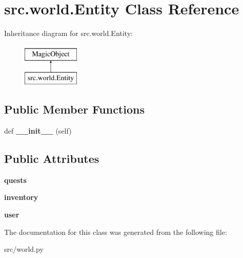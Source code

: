 \hypertarget{classsrc_1_1world_1_1_entity}{}\section{src.\+world.\+Entity Class Reference}
\label{classsrc_1_1world_1_1_entity}
Inheritance diagram for src.\+world.\+Entity\+:\begin{figure}[H]
\begin{center}
\leavevmode
\includegraphics[height=2.000000cm]{classsrc_1_1world_1_1_entity}
\end{center}
\end{figure}
\subsection*{Public Member Functions}
\begin{DoxyCompactItemize}
\item 
\hypertarget{classsrc_1_1world_1_1_entity_a1a31674f6b3c2e9ec166dde522201412}{}\label{classsrc_1_1world_1_1_entity_a1a31674f6b3c2e9ec166dde522201412} 
def {\bfseries \+\_\+\+\_\+init\+\_\+\+\_\+} (self)
\end{DoxyCompactItemize}
\subsection*{Public Attributes}
\begin{DoxyCompactItemize}
\item 
\hypertarget{classsrc_1_1world_1_1_entity_a11d2b9d0be9916f434438aed5873cd8f}{}\label{classsrc_1_1world_1_1_entity_a11d2b9d0be9916f434438aed5873cd8f} 
{\bfseries quests}
\item 
\hypertarget{classsrc_1_1world_1_1_entity_aac5326b05a40e70cdbedc3850715e4d5}{}\label{classsrc_1_1world_1_1_entity_aac5326b05a40e70cdbedc3850715e4d5} 
{\bfseries inventory}
\item 
\hypertarget{classsrc_1_1world_1_1_entity_a074fdc69660c578006d1377159a13912}{}\label{classsrc_1_1world_1_1_entity_a074fdc69660c578006d1377159a13912} 
{\bfseries user}
\end{DoxyCompactItemize}


The documentation for this class was generated from the following file\+:\begin{DoxyCompactItemize}
\item 
src/world.\+py\end{DoxyCompactItemize}

